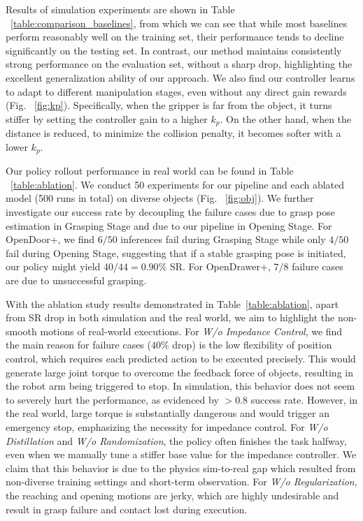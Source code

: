 Results of simulation experiments are shown in Table ~\ref{table:comparison_baselines}, from which we can see that while most baselines perform reasonably well on the training set, their performance tends to decline significantly on the testing set. In contrast, our method maintains consistently strong performance on the evaluation set, without a sharp drop, highlighting the excellent generalization ability of our approach. We also find our controller learns to adapt to different manipulation stages, even without any direct gain rewards (Fig. ~\ref{fig:kp}). Specifically, when the gripper is far from the object, it turns stiffer by setting the controller gain to a higher $k_p$. On the other hand, when the distance is reduced, to minimize the collision penalty, it becomes softer with a lower $k_p$.

Our policy rollout performance in real world can be found in Table ~\ref{table:ablation}. We conduct 50 experiments for our pipeline and each ablated model (500 runs in total) on diverse objects (Fig. ~\ref{fig:obj}). We further investigate our success rate by decoupling the failure cases due to grasp pose estimation in Grasping Stage and due to our pipeline in Opening Stage. For OpenDoor+, we find $6/50$ inferences fail during Grasping Stage while only $4/50$ fail during Opening Stage, suggesting that if a stable grasping pose is initiated, our policy might yield $40/44=0.90\%$ SR. For OpenDrawer+, $7/8$ failure cases are due to unsuccessful grasping.

With the ablation study results demonstrated in Table~\ref{table:ablation}, apart from SR drop in both simulation and the real world, we aim to highlight the non-smooth motions of real-world executions. For \textit{W/o Impedance Control}, we find the main reason for failure cases ($40\%$ drop) is the low flexibility of position control, which requires each predicted action to be executed precisely. This would generate large joint torque to overcome the feedback force of objects, resulting in the robot arm being triggered to stop. In simulation, this behavior does not seem to severely hurt the performance, as evidenced by $>0.8$ success rate. However, in the real world, large torque is substantially dangerous and would trigger an emergency stop, emphasizing the necessity for impedance control. For \textit{W/o Distillation} and \textit{W/o Randomization}, the policy often finishes the task halfway, even when we manually tune a stiffer base value for the impedance controller. We claim that this behavior is due to the physics sim-to-real gap which resulted from non-diverse training settings and short-term observation. For \textit{W/o Regularization}, the reaching and opening motions are jerky, which are highly undesirable and result in grasp failure and contact lost during execution. 

